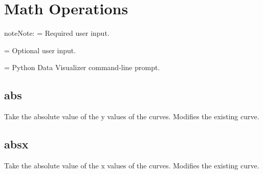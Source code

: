 \documentclass[letterpaper,10pt,english]{sphinxmanual}
\begin{document}
\begin{sphinxVerbatim}[commandchars=\\\{\}]
\PYG{p}{[}\PYG{p}{]}   
\end{sphinxVerbatim}


\section{Math Operations}
\label{\detokenize{math_operations:math-operations}}\label{\detokenize{math_operations:id1}}\label{\detokenize{math_operations::doc}}
\begin{sphinxadmonition}{note}{Note:}
\sphinxstylestrong{\textless{} \textgreater{}} = Required user input.

\sphinxstylestrong{{[} {]}} = Optional user input.

\sphinxstylestrong{{[}PyDV{]}:} = Python Data Visualizer command-line prompt.
\end{sphinxadmonition}


\subsection{abs}
\label{\detokenize{math_operations:abs}}
Take the absolute value of the y values of the curves. Modifies the existing curve.

\begin{sphinxVerbatim}[commandchars=\\\{\}]
\PYG{p}{[}\PYG{p}{]}  
\end{sphinxVerbatim}


\subsection{absx}
\label{\detokenize{math_operations:absx}}
Take the absolute value of the x values of the curves. Modifies the existing curve.

\begin{sphinxVerbatim}[commandchars=\\\{\}]
\PYG{p}{[}\PYG{p}{]}  
\end{sphinxVerbatim}
\end{document}
